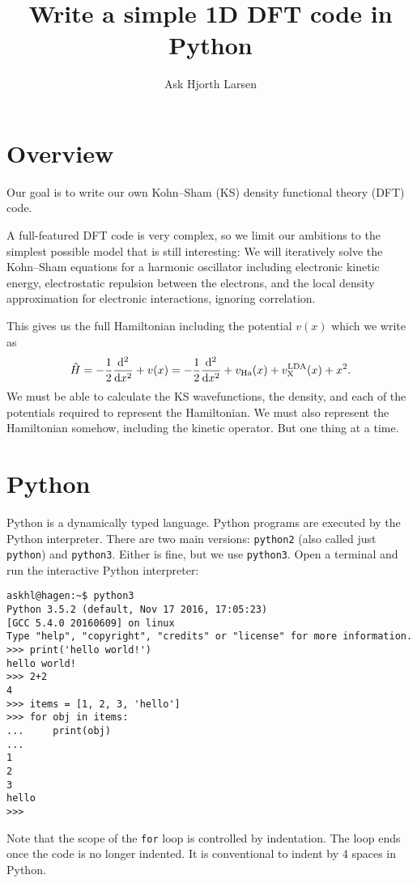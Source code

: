 \documentclass{article}
\title{Write a simple 1D DFT code in Python}
\author{Ask Hjorth Larsen}
\begin{document}
\maketitle

\section*{Overview}

Our goal is to write our own Kohn--Sham (KS) density functional theory
(DFT) code.

A full-featured DFT code is very complex, so we limit our ambitions
to the simplest possible model that is still interesting:
We will iteratively solve the Kohn--Sham
equations for a harmonic oscillator including electronic kinetic
energy, electrostatic repulsion between the electrons, and the
local density approximation for electronic interactions, ignoring correlation.

This gives us the full Hamiltonian including the potential $v(x)$
which we write as
\begin{align}
\hat H = -\frac12 \frac{\mathrm d ^2}{\mathrm d x^2} + v(x) = -\frac12 \frac{\mathrm d ^2}{\mathrm d x^2} + v_{\mathrm{Ha}}(x) + v_{\mathrm X}^{\mathrm{LDA}}(x) + x^2.
\end{align}
We must be able to calculate the KS wavefunctions, the
density, and each of the potentials required to represent the
Hamiltonian.  We must also represent the Hamiltonian somehow,
including the kinetic operator.  But one thing at a time.

\section*{Python}
Python is a dynamically typed language.  Python programs are executed
by the Python interpreter.
There are two main versions:
\texttt{python2} (also called just \texttt{python}) and \texttt{python3}.
Either is fine, but we use \texttt{python3}.
Open a terminal and
run the interactive Python interpreter:

\begin{verbatim}
askhl@hagen:~$ python3
Python 3.5.2 (default, Nov 17 2016, 17:05:23)
[GCC 5.4.0 20160609] on linux
Type "help", "copyright", "credits" or "license" for more information.
>>> print('hello world!')
hello world!
>>> 2+2
4
>>> items = [1, 2, 3, 'hello']
>>> for obj in items:
...     print(obj)
...
1
2
3
hello
>>>
\end{verbatim}
Note that the scope of the \lstinline{for} loop is controlled by indentation.
The loop ends once the code is no longer indented.
It is conventional to indent by 4 spaces in Python.
\end{document}
